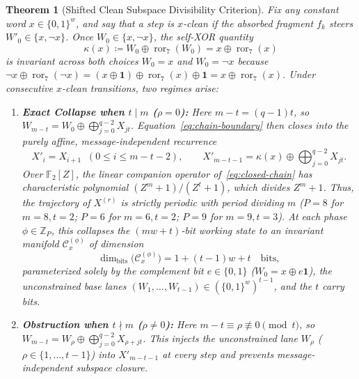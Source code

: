 \documentclass[11pt,a4paper]{article}
\newtheorem{theorem}{Theorem}
\theoremstyle{definition}
\theoremstyle{remark}
\newcommand{\Ftwo}{\mathbb{F}_2}
\newcommand{\ror}{\operatorname{ror}}
\begin{document}
\begin{theorem}[Shifted Clean Subspace Divisibility Criterion]
\label{thm:divisibility}
Fix any constant word $x \in \{0,1\}^w$, and say that a step is \emph{$x$-clean} if the absorbed fragment $f_k$ steers $W'_0 \in \{x, \neg x\}$. Once $W_0 \in \{x, \neg x\}$, the self-XOR quantity
\begin{equation}
    \kappa(x) \coloneqq W_0 \oplus \ror_7(W_0) = x \oplus \ror_7(x)
    \label{eq:kappa-const}
\end{equation}
is invariant across both choices $W_0 = x$ and $W_0 = \neg x$ because $\neg x \oplus \ror_7(\neg x) = (x \oplus \mathbf{1}) \oplus \ror_7(x) \oplus \mathbf{1} = x \oplus \ror_7(x)$. Under consecutive $x$-clean transitions, two regimes arise:
\begin{enumerate}[leftmargin=2em]
    \item \textbf{Exact Collapse when $t \mid m$ ($\rho = 0$):} Here $m - t = (q - 1)t$, so $W_{m-t} = W_0 \oplus \bigoplus_{j=0}^{q-2} X_{jt}$. Equation~\eqref{eq:chain-boundary} then closes into the purely affine, message-independent recurrence
    \begin{equation}
        X'_i = X_{i+1} \;\;(0 \le i \le m - t - 2), \qquad
        X'_{m-t-1} = \kappa(x) \oplus \bigoplus_{j=0}^{q-2} X_{jt}.
        \label{eq:closed-chain}
    \end{equation}
    Over $\Ftwo[Z]$, the linear companion operator of~\eqref{eq:closed-chain} has characteristic polynomial $(Z^m + 1)/(Z^t + 1)$, which divides $Z^m + 1$. Thus, the trajectory of $X^{(r)}$ is strictly periodic with period dividing $m$ ($P = 8$ for $m = 8, t = 2$; $P = 6$ for $m = 6, t = 2$; $P = 9$ for $m = 9, t = 3$). At each phase $\phi \in \mathbb{Z}_P$, this collapses the $(mw + t)$-bit working state to an invariant manifold $\mathcal{C}_x^{(\phi)}$ of dimension
    \[
        \dim_{\mathrm{bits}}\bigl(\mathcal{C}_x^{(\phi)}\bigr) = 1 + (t - 1)w + t \quad \text{bits},
    \]
    parameterized solely by the complement bit $e \in \{0,1\}$ ($W_0 = x \oplus e\mathbf{1}$), the unconstrained base lanes $(W_1, \dots, W_{t-1}) \in (\{0,1\}^w)^{t-1}$, and the $t$ carry bits.
    \item \textbf{Obstruction when $t \nmid m$ ($\rho \neq 0$):} Here $m - t \equiv \rho \not\equiv 0 \pmod t$, so $W_{m-t} = W_\rho \oplus \bigoplus_{j=0}^{q-2} X_{\rho + jt}$. This injects the unconstrained lane $W_\rho$ ($\rho \in \{1, \dots, t-1\}$) into $X'_{m-t-1}$ at every step and prevents message-independent subspace closure.
\end{enumerate}
\end{theorem}
\end{document}
